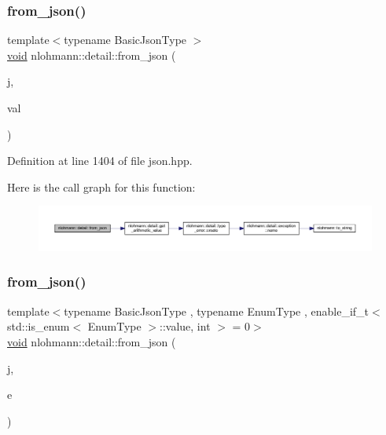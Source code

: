 \subsubsection{\texorpdfstring{from\_json()}{from\_json()}\hspace{0.1cm}{\footnotesize\ttfamily [7/18]}}
{\footnotesize\ttfamily template$<$typename Basic\+Json\+Type $>$ \\
\mbox{\hyperlink{namespacenlohmann_1_1detail_a59fca69799f6b9e366710cb9043aa77d}{void}} nlohmann\+::detail\+::from\+\_\+json (\begin{DoxyParamCaption}\item[{const Basic\+Json\+Type \&}]{j,  }\item[{typename Basic\+Json\+Type\+::number\+\_\+integer\+\_\+t \&}]{val }\end{DoxyParamCaption})}



Definition at line 1404 of file json.\+hpp.

Here is the call graph for this function\+:
\nopagebreak
\begin{figure}[H]
\begin{center}
\leavevmode
\includegraphics[width=350pt]{namespacenlohmann_1_1detail_a047d881e611fcac709dc318f730a1732_cgraph}
\end{center}
\end{figure}
\mbox{\label{namespacenlohmann_1_1detail_a5440d650150d01e8015133521351b459}} 
\subsubsection{\texorpdfstring{from\_json()}{from\_json()}\hspace{0.1cm}{\footnotesize\ttfamily [8/18]}}
{\footnotesize\ttfamily template$<$typename Basic\+Json\+Type , typename Enum\+Type , enable\+\_\+if\+\_\+t$<$ std\+::is\+\_\+enum$<$ Enum\+Type $>$\+::value, int $>$  = 0$>$ \\
\mbox{\hyperlink{namespacenlohmann_1_1detail_a59fca69799f6b9e366710cb9043aa77d}{void}} nlohmann\+::detail\+::from\+\_\+json (\begin{DoxyParamCaption}\item[{const Basic\+Json\+Type \&}]{j,  }\item[{Enum\+Type \&}]{e }\end{DoxyParamCaption})}




